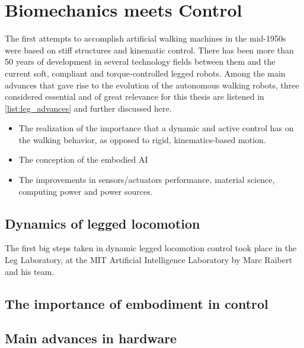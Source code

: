 
\section{Biomechanics meets Control} %
\label{sec:biomechanics_vs_control}
The first attempts to accomplish artificial walking machines in the mid-1950s were based on stiff structures and kinematic control.
There has been more than 50 years of development in several technology fields between them and the current soft, compliant and torque-controlled legged robots.
Among the main advances that gave rise to the evolution of the autonomous walking robots, three considered essential and of great relevance for this thesis are listened in \ref{list:leg_advances} and further discussed here.

\begin{itemize}
\label{list:leg_advances}
	\item The realization of the importance that a dynamic and active control has on the walking behavior, as opposed to rigid, kinematics-based motion.
	\item The conception of the embodied AI
	\item The improvements in sensors/actuators performance, material science, computing power and power sources.
\end{itemize}

\subsection{Dynamics of legged locomotion} %
\label{sub:dynamics_control}
The first big steps taken in dynamic legged locomotion control took place in the Leg Laboratory, at the MIT Artificial Intelligence Laboratory by Marc Raibert and his team.



\subsection{The importance of embodiment in control} %
\label{sub:the_embodiment_}

\subsection{Main advances in hardware} %
\label{sub:the_advances_in_hardware}



